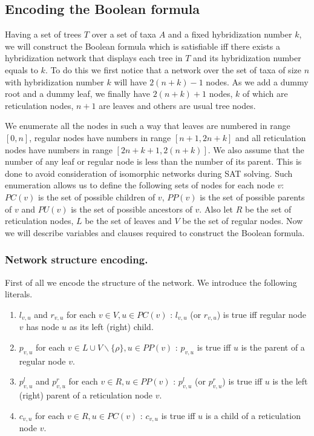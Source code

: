 \documentclass[runningheads, envcountsame, a4paper]{llncs}
\begin{document}
\subsection{Encoding the Boolean formula}

Having a set of trees $T$ over a set of taxa $A$ and a fixed hybridization number $k$, we will construct the Boolean formula 
which is satisfiable iff there exists a hybridization network that displays each tree in $T$ and its hybridization 
number equals to $k$. To do this we first notice that a network over the set of taxa of size $n$ with hybridization number 
$k$ will have $2 (n + k) - 1$ nodes. As we add a dummy root and a dummy leaf, we finally have $2 (n + k) + 1$ nodes, 
$k$ of which are reticulation nodes, $n + 1$ are leaves and others are usual tree nodes.

We enumerate all the nodes in such a way 
that leaves are numbered in range $[0,n]$, regular nodes have numbers in range $[n + 1,2n + k]$ and all reticulation nodes have numbers 
in range $[2n + k + 1, 2(n + k)]$. We also assume that the number of any leaf or regular node is less than the number of its parent. This is done to 
avoid consideration of isomorphic networks during SAT solving. Such enumeration allows us to define the following sets of nodes for each node 
$v$: $PC(v)$ is the set of possible children of $v$, $PP(v)$ is the set of possible parents of $v$ and $PU(v)$ is the set of possible ancestors of $v$. Also let $R$ be the set of reticulation nodes, $L$ be the set of leaves and $V$ be the set of regular nodes. 
Now we will describe variables and clauses required to construct the Boolean formula.

\subsubsection{Network structure encoding.} 

First of all we encode the structure of the network. We introduce the following literals. 

\begin{enumerate}

\item $l_{v,u}$ and $r_{v,u}$ for each $v \in V, u \in PC(v)$ : 
$l_{v,u}$ (or $r_{v,u}$) is true iff regular node $v$ has node $u$ as its left (right) child.

\item $p_{v,u}$  for each $v \in L \cup V \backslash \{\rho\}, u \in PP(v)$ :
$p_{v,u}$ is true iff $u$ is the parent of a regular node $v$.

\item $p^l_{v,u}$ and $p^r_{v,u}$ for each $v \in R, u \in PP(v)$ :
$p^l_{v,u}$ (or $p^r_{v,u}$) is true iff $u$ is the left (right) parent of a reticulation node $v$.

\item $c_{v,u}$ for each $v \in R, u \in PC(v)$ :
$c_{v,u}$ is true iff $u$ is a child of a reticulation node $v$.

\end{enumerate}
\end{document}
